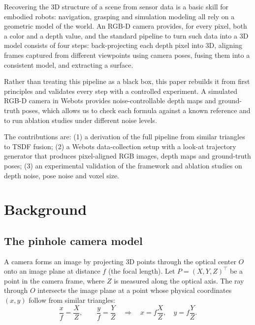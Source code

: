 \documentclass[11pt,a4paper]{article}
\begin{document}
Recovering the 3D structure of a scene from sensor data is a basic skill for
embodied robots: navigation, grasping and simulation modeling all rely on a
geometric model of the world. An RGB-D camera provides, for every pixel, both a
color and a depth value, and the standard pipeline to turn such data into a 3D
model consists of four steps: back-projecting each depth pixel into 3D,
aligning frames captured from different viewpoints using camera poses, fusing
them into a consistent model, and extracting a surface.

Rather than treating this pipeline as a black box, this paper rebuilds it from
first principles and validates every step with a controlled experiment. A
simulated RGB-D camera in Webots provides noise-controllable depth maps and
ground-truth poses, which allows us to check each formula against a known
reference and to run ablation studies under different noise levels.

The contributions are: (1) a derivation of the full pipeline from similar
triangles to TSDF fusion; (2) a Webots data-collection setup with a
look-at trajectory generator that produces pixel-aligned RGB images, depth
maps and ground-truth poses; (3) an experimental validation of the framework
and ablation studies on depth noise, pose noise and voxel size.

\section{Background}

\subsection{The pinhole camera model}

A camera forms an image by projecting 3D points through the optical center $O$
onto an image plane at distance $f$ (the focal length). Let
$P=(X,Y,Z)^\top$ be a point in the camera frame, where $Z$ is measured along
the optical axis. The ray through $O$ intersects the image plane at a point
whose physical coordinates $(x,y)$ follow from similar triangles:
\begin{equation}
\frac{x}{f}=\frac{X}{Z},\qquad \frac{y}{f}=\frac{Y}{Z}
\quad\Longrightarrow\quad
x=f\frac{X}{Z},\quad y=f\frac{Y}{Z}.
\label{eq:similar}
\end{equation}
\end{document}
